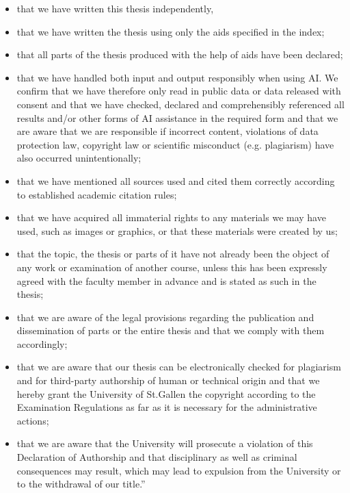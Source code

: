 \documentclass[hidelinks, 12pt, a4paper]{article}
\theoremstyle{definition}
\begin{document}
\begin{itemize}
    \item that we have written this thesis independently,
    
    \item that we have written the thesis using only the aids specified in the index;
    
    \item that all parts of the thesis produced with the help of aids have been declared;
    
    \item that we have handled both input and output responsibly when using AI. We confirm that we have therefore only read in public data or data released with consent and that we have checked, declared and comprehensibly referenced all results and/or other forms of AI assistance in the required form and that we are aware that we are responsible if incorrect content, violations of data protection law, copyright law or scientific misconduct (e.g. plagiarism) have also occurred unintentionally;
    
    \item that we have mentioned all sources used and cited them correctly according to established academic citation rules;
    
    \item that we have acquired all immaterial rights to any materials we may have used, such as images or graphics, or that these materials were created by us;
    
    \item that the topic, the thesis or parts of it have not already been the object of any work or examination of another course, unless this has been expressly agreed with the faculty member in advance and is stated as such in the thesis;
    
    \item that we are aware of the legal provisions regarding the publication and dissemination of parts or the entire thesis and that we comply with them accordingly;
    
    \item that we are aware that our thesis can be electronically checked for plagiarism and for third-party authorship of human or technical origin and that we hereby grant the University of St.Gallen the copyright according to the Examination Regulations as far as it is necessary for the administrative actions;
    
    \item that we are aware that the University will prosecute a violation of this Declaration of Authorship and that disciplinary as well as criminal consequences may result, which may lead to expulsion from the University or to the withdrawal of our title.”
\end{itemize}
\end{document}
